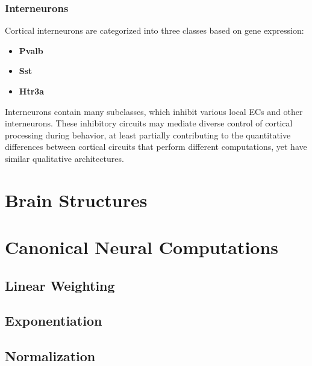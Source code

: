 \subsubsection{Interneurons}

Cortical interneurons are categorized into three classes based on gene expression:
\begin{itemize}
	\item \textbf{Pvalb}
	\item \textbf{Sst}
	\item \textbf{Htr3a}
\end{itemize}
Interneurons contain many subclasses, which inhibit various local ECs and other interneurons. These inhibitory circuits may mediate diverse control of cortical processing during behavior, at least partially contributing to the quantitative differences between cortical circuits that perform different computations, yet have similar qualitative architectures. 


\section{Brain Structures}

\section{Canonical Neural Computations}

\subsection{Linear Weighting}


\subsection{Exponentiation}


\subsection{Normalization}

